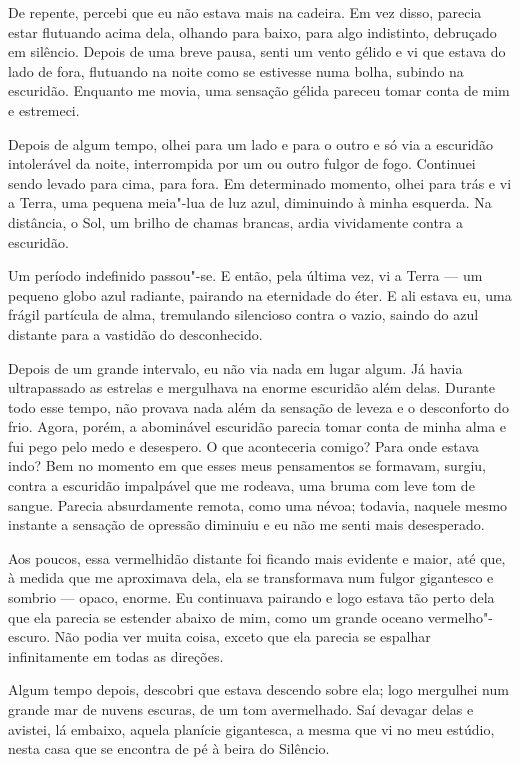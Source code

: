 De repente, percebi que eu não estava mais na cadeira. Em vez disso, parecia estar flutuando acima dela, olhando para
baixo, para algo indistinto, debruçado em silêncio. Depois de uma breve pausa, senti um vento gélido e vi que estava do
lado de fora, flutuando na noite como se estivesse numa bolha, subindo na escuridão. Enquanto me movia, uma sensação
gélida pareceu tomar conta de mim e estremeci.

Depois de algum tempo, olhei para um lado e para o outro e só via a escuridão intolerável da noite, interrompida por um
ou outro fulgor de fogo. Continuei sendo levado para cima, para fora. Em determinado momento, olhei para trás e vi a
Terra, uma pequena meia"-lua de luz azul, diminuindo à minha esquerda. Na distância, o Sol, um brilho de chamas brancas,
ardia vividamente contra a escuridão.

Um período indefinido passou"-se. E então, pela última vez, vi a Terra --- um pequeno globo azul radiante, pairando na
eternidade do éter. E ali estava eu, uma frágil partícula de alma, tremulando silencioso contra o vazio, saindo do
azul distante para a vastidão do desconhecido.

Depois de um grande intervalo, eu não via nada em lugar algum. Já havia ultrapassado as estrelas e mergulhava na
enorme escuridão além delas. Durante todo esse tempo, não provava nada além da sensação de leveza e o desconforto do
frio. Agora, porém, a abominável escuridão parecia tomar conta de minha alma e fui pego pelo medo e desespero. O que
aconteceria comigo? Para onde estava indo? Bem no momento em que esses meus pensamentos se formavam, surgiu, contra a
escuridão impalpável que me rodeava, uma bruma com leve tom de sangue. Parecia absurdamente remota, como uma névoa;
todavia, naquele mesmo instante a sensação de opressão diminuiu e eu não me senti mais desesperado.

Aos poucos, essa vermelhidão distante foi ficando mais evidente e maior, até que, à medida que me aproximava dela, ela
se transformava num fulgor gigantesco e sombrio --- opaco, enorme. Eu continuava pairando e logo estava tão perto
dela que ela parecia se estender abaixo de mim, como um grande oceano vermelho"-escuro. Não podia ver muita coisa,
exceto que ela parecia se espalhar infinitamente em todas as direções.

Algum tempo depois, descobri que estava descendo sobre ela; logo mergulhei num grande mar de nuvens escuras, de um tom
avermelhado. Saí devagar delas e avistei, lá embaixo, aquela planície gigantesca, a mesma que vi no meu estúdio,
nesta casa que se encontra de pé à beira do Silêncio.

